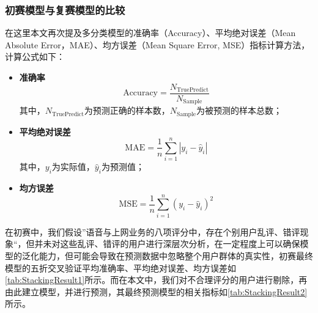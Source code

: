 \documentclass{MathorCupmodeling}
\begin{document}
	\subsubsection{初赛模型与复赛模型的比较}
	在这里本文再次提及多分类模型的准确率（Accuracy）、平均绝对误差（Mean Absolute Error，MAE）、均方误差（Mean Square Error, MSE）指标计算方法，计算公式如下：
	\begin{itemize}
		\item \textbf{准确率}
			\begin{equation}
			\mathrm{Accuracy}=\frac{N_{\mathrm{TruePredict}}}{N_{\mathrm{Sample}}} \label{Accuracy}
			\end{equation}
		其中，$N_{\mathrm{TruePredict}}$为预测正确的样本数，$N_{\mathrm{Sample}}$为被预测的样本总数；
		\item \textbf{平均绝对误差}
			\begin{equation}
			\mathrm{MAE}=\frac{1}{n}\sum_{i=1}^{n}\left|y_{i}-\hat{y}_{i}\right| \label{MAE}
			\end{equation}
		其中，$y_i$为实际值，$\hat{y}_i$为预测值；
		\item \textbf{均方误差}
			\begin{equation}
			\mathrm{MSE}=\frac{1}{n}\sum_{i=1}^{n}\left(y_{i}-\hat{y}_{i}\right)^{2} \label{MSE}
			\end{equation}
	\end{itemize}

	在初赛中，我们假设”语音与上网业务的八项评分中，存在个别用户乱评、错评现象“，但并未对这些乱评、错评的用户进行深层次分析，在一定程度上可以确保模型的泛化能力，但可能会导致在预测数据中忽略整个用户群体的真实性，初赛最终模型的五折交叉验证平均准确率、平均绝对误差、均方误差如\textcolor{blue}{\cref{tab:StackingResult1}}所示。而在本文中，我们对不合理评分的用户进行剔除，再由此建立模型，并进行预测，其最终预测模型的相关指标如\textcolor{blue}{\cref{tab:StackingResult2}}所示。
\end{document}
